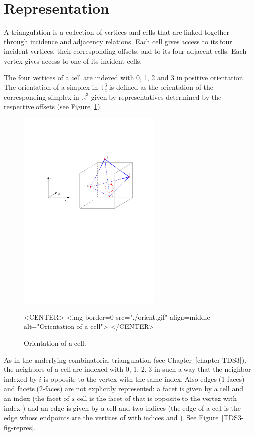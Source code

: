 \section{Representation\label{P3Triangulation3-sec-intro}}

A triangulation is a collection of vertices and cells that are linked
together through incidence and adjacency relations. Each cell gives
access to its four incident vertices, their corresponding offsets, and
to its four adjacent cells. Each vertex gives access to one of its
incident cells.

The four vertices of a cell are indexed with 0, 1, 2 and 3 in positive
orientation. The orientation of a simplex in $\mathbb T_c^3$ is
defined as the orientation of the corresponding simplex in $\mathbb
R^3$ given by representatives determined by the respective offsets
(see Figure~\ref{P3Triangulation3-fig-orient}).

\begin{figure}[htbp]
\begin{ccTexOnly}
\begin{center} 
\includegraphics[width=7cm]{Periodic_3_triangulation_3/orient} 
\end{center}
\end{ccTexOnly}
\begin{ccHtmlOnly}
<CENTER>
<img border=0 src="./orient.gif" align=middle alt="Orientation of a cell">
</CENTER>
\end{ccHtmlOnly}
\caption{Orientation of a cell.
\label{P3Triangulation3-fig-orient}}
\end{figure} 

As in the underlying combinatorial triangulation (see
Chapter~\ref{chapter-TDS3}), the neighbors of a cell are indexed with
0, 1, 2, 3 in such a way that the neighbor indexed by $i$ is opposite
to the vertex with the same index. Also edges ($1$-faces) and facets
($2$-faces) are not explicitly represented: a facet is given by a cell
and an index (the facet  of a cell  is the facet of
 that is opposite to the vertex with index ) and an edge
is given by a cell and two indices (the edge  of a cell
 is the edge whose endpoints are the vertices of  with
indices  and ). See Figure~\ref{TDS3-fig-repres}.  

